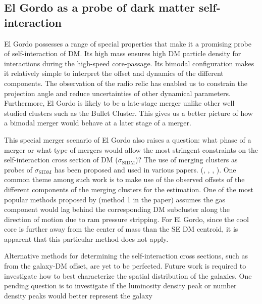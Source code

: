 \documentclass[ucdthesis.tex]{subfiles}
\begin{document}
    \subsection{El Gordo as a probe of dark matter self-interaction}
    El Gordo possesses a range of special properties that make it a promising
    probe of self-interaction of DM. Its high mass ensures high DM
    particle density for interactions during the high-speed core-passage. Its bimodal configuration makes it
    relatively simple to interpret the offset and dynamics of the different
    components. The observation of the radio relic has enabled us to
    constrain the projection angle and reduce uncertainties of other dynamical
    parameters. Furthermore, El Gordo is likely to be a late-stage merger
    unlike other well studied clusters such as the Bullet Cluster. This gives
    us a better picture of how a bimodal merger would behave at a later stage of a merger. \par 
    This special merger scenario of El Gordo also raises a question: what phase
    of a merger or what type of mergers would allow the most stringent
    constraints on the self-interaction cross section of DM ($\sigma_{\text{SIDM}}$)? 
    The use of merging clusters as probes of $\sigma_{\text{SIDM}}$ 
    has been proposed and used in various papers.
    (\citealt{Markevitch2004}, \citealt{Randall2008d}, \citealt{Merten2011},
    \citealt{Dawson12}). One common theme among such work is
    to make use of the observed offsets of the different components of the
    merging clusters for the estimation. One of the most popular methods proposed by
    \citealt{Markevitch2004} (method 1 in the paper) assumes the gas component would lag behind the corresponding DM
    subcluster along the direction of motion due to ram pressure stripping.   
    For El Gordo, since the cool core is further away from the
    center of mass than the SE DM centroid, it is apparent that this particular
    method does not apply.\par 
    Alternative methods for determining the self-interaction cross sections,
    such as from the galaxy-DM offset, are yet to be perfected. Future work is
    required to investigate how to best characterize the spatial distribution
    of the galaxies. One pending question is to investigate if the luminosity
    density peak or number density peaks would better represent the galaxy
\end{document}
